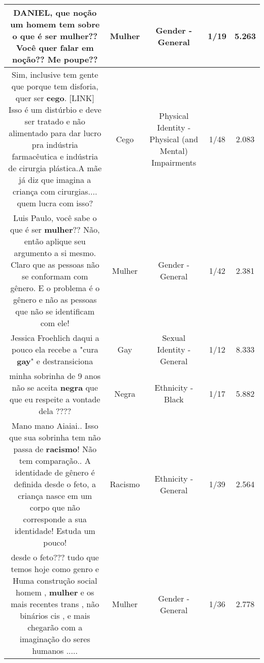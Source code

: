 \documentclass[11pt]{article}
\newlength\mylength
\begin{document}
\begin{center}
\begin{longtable}{|C{.65\mylength}|C{.30\mylength}|C{.12\mylength}|C{.12\mylength}|C{.12\mylength}|}
  \small DANIEL, que noção um homem tem sobre o que é ser \textbf{mulher}?? Você quer falar em noção?? Me poupe??\normalsize   & Mulher & Gender - General & 1/19 & 5.263 \\  \hline
  \small Sim, inclusive tem gente que porque tem disforia, quer ser \textbf{cego}.  [LINK] Isso é um distúrbio e deve ser tratado e não alimentado para dar lucro pra indústria farmacêutica e indústria de cirurgia plástica.A mãe já diz que imagina a criança com cirurgias.... quem lucra com isso?\normalsize   & Cego & Physical Identity - Physical (and Mental) Impairments & 1/48 & 2.083 \\  \hline
  \small Luis Paulo, você sabe o que é ser \textbf{mulher}?? Não, então aplique seu argumento a si mesmo. Claro que as pessoas não se conformam com gênero. E o problema é o gênero e não as pessoas que não se identificam com ele!\normalsize   & Mulher & Gender - General & 1/42 & 2.381 \\  \hline
  \small Jessica Froehlich daqui a pouco ela recebe a "cura \textbf{gay}" e destransiciona\normalsize   & Gay & Sexual Identity - General & 1/12 & 8.333 \\  \hline
  \small minha sobrinha de 9 anos não se aceita \textbf{negra} que que eu respeite a vontade dela ????\normalsize   & Negra & Ethnicity - Black & 1/17 & 5.882 \\  \hline
  \small Mano mano Aiaiai.. Isso que sua sobrinha tem não passa de \textbf{racismo}! Não tem comparação.. A identidade de gênero é definida desde o feto, a criança nasce em um corpo que não corresponde a sua identidade! Estuda um pouco!\normalsize   & Racismo & Ethnicity - General & 1/39 & 2.564 \\  \hline
  \small desde o feto??? tudo que temos hoje como genro e Huma construção social homem , \textbf{mulher} e os mais recentes trans , não binários  cis , e mais  chegarão com a imaginação do seres humanos .....\normalsize   & Mulher & Gender - General & 1/36 & 2.778 \\  \hline

\end{longtable}
\end{center}
\end{document}
